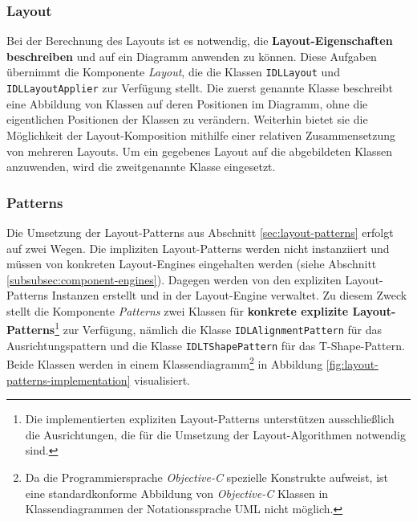 \subsubsection{Layout}

Bei der Berechnung des Layouts ist es notwendig, die \textbf{Layout-Eigenschaften beschreiben} und auf ein Diagramm anwenden zu können. Diese Aufgaben übernimmt die Komponente \textit{Layout}, die die Klassen \texttt{IDLLayout} und \texttt{IDLLayoutApplier} zur Verfügung stellt. Die zuerst genannte Klasse beschreibt eine Abbildung von Klassen auf deren Positionen im Diagramm, ohne die eigentlichen Positionen der Klassen zu verändern. Weiterhin bietet sie die Möglichkeit der Layout-Komposition mithilfe einer relativen Zusammensetzung von mehreren Layouts. Um ein gegebenes Layout auf die abgebildeten Klassen anzuwenden, wird die zweitgenannte Klasse eingesetzt.

\subsubsection{Patterns}
\label{subsubsec:patterns}

Die Umsetzung der Layout-Patterns aus Abschnitt \ref{sec:layout-patterns} erfolgt auf zwei Wegen. Die impliziten Layout-Patterns werden nicht instanziiert und müssen von konkreten Layout-Engines eingehalten werden (siehe Abschnitt \ref{subsubsec:component-engines}). Dagegen werden von den expliziten Layout-Patterns Instanzen erstellt und in der Layout-Engine verwaltet. Zu diesem Zweck stellt die Komponente \textit{Patterns} zwei Klassen für \textbf{konkrete explizite Layout-Patterns}\footnote{Die implementierten expliziten Layout-Patterns unterstützen ausschließlich die Ausrichtungen, die für die Umsetzung der Layout-Algorithmen notwendig sind.} zur Verfügung, nämlich die Klasse \texttt{IDLAlignment\-Pat\-tern} für das Ausrichtungspattern und die Klasse \texttt{IDLTShapePattern} für das T-Shape-Pattern. Beide Klassen werden in einem Klassendiagramm\footnote{Da die Programmiersprache \textit{Objective-C} spezielle Konstrukte aufweist, ist eine standardkonforme Abbildung von \textit{Objective-C} Klassen in Klassendiagrammen der Notationssprache UML nicht möglich.} in Abbildung \ref{fig:layout-patterns-implementation} visualisiert.

